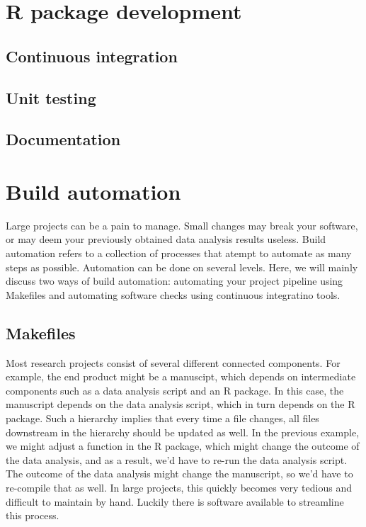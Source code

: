 \documentclass[]{book}
\begin{document}
\chapter{R package development}\label{r-package-development}

\section{Continuous integration}\label{continuous-integration}

\section{Unit testing}\label{unit-testing}

\section{Documentation}\label{documentation}

\chapter{Build automation}\label{chptr-workflow-automation}

Large projects can be a pain to manage. Small changes may break your
software, or may deem your previously obtained data analysis results
useless. Build automation refers to a collection of processes that
atempt to automate as many steps as possible. Automation can be done on
several levels. Here, we will mainly discuss two ways of build
automation: automating your project pipeline using Makefiles and
automating software checks using continuous integratino tools.

\section{Makefiles}\label{makefiles}

Most research projects consist of several different connected
components. For example, the end product might be a manuscipt, which
depends on intermediate components such as a data analysis script and an
R package. In this case, the manuscript depends on the data analysis
script, which in turn depends on the R package. Such a hierarchy implies
that every time a file changes, all files downstream in the hierarchy
should be updated as well. In the previous example, we might adjust a
function in the R package, which might change the outcome of the data
analysis, and as a result, we'd have to re-run the data analysis script.
The outcome of the data analysis might change the manuscript, so we'd
have to re-compile that as well. In large projects, this quickly becomes
very tedious and difficult to maintain by hand. Luckily there is
software available to streamline this process.
\end{document}
